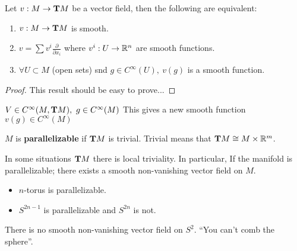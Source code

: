 \begin{teorema}
Let $v:M\to \text{\textbf{T}} M$ be a vector field, then the following are equivalent:
\begin{enumerate}[1)]
\item $v:M\to \text{\textbf{T}} M$ is smooth.
\item $v= \sum v^i \frac{\partial}{\partial x_i} $ where $v^i: U\to \mathbb{R}^n$ are smooth functions.
\item $\forall U\subset M$ (open sets) snd $g\in C^\infty (U),\ v(g)$ is a smooth function.  
\end{enumerate}
\begin{proof}
This result should be easy to prove...
\end{proof}
\end{teorema}

$V\in C^\infty(M,\text{\textbf{T}} M),\ g\in C^\infty(M)$ This gives a new smooth function $v(g)\in C^\infty(M)$ 

\begin{ddef}
$M$ is \textbf{parallelizable} if $\text{\textbf{T}} M$ is trivial. Trivial means that $\text{\textbf{T}} M \cong M\times \mathbb{R}^m$. 
\end{ddef} 
In some situations $\text{\textbf{T}} M$ there is local triviality. In particular, If the manifold is parallelizable; there exists a smooth non-vanishing vector field on $M$.\\
\begin{examples}
\begin{itemize}
\item $n$-torus is parallelizable.
\item $S^{2n-1} $ is parallelizable and $S^{2n}$ is not.
\end{itemize}
\end{examples}

\begin{teorema}
There is no smooth non-vanishing vector field on $S^2$. ``You can't comb the sphere''.
\end{teorema}
